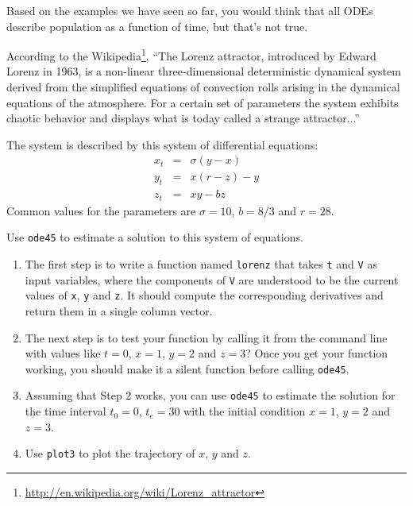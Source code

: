 \documentclass{book}
\begin{document}
\begin{ex}

Based on the examples we have seen so far, you would think that
all ODEs describe population as
a function of time, but that's not true.

According to the
Wikipedia\footnote{\url{http://en.wikipedia.org/wiki/Lorenz_attractor}},
``The Lorenz attractor, introduced by Edward Lorenz in 1963, is a
non-linear three-dimensional deterministic dynamical system derived
from the simplified equations of convection rolls arising in the
dynamical equations of the atmosphere. For a certain set of parameters
the system exhibits chaotic behavior and displays what is today called
a strange attractor...''

The system is described by this system of differential equations:
%
\begin{eqnarray}
x_t &=& \sigma (y - x) \\
y_t &=& x (r - z) - y  \\
z_t &=& xy - b z
\end{eqnarray}
%
Common values for the parameters are $\sigma = 10$, $b = 8/3$ and $r=28$.

Use {\tt ode45} to estimate a solution to this
system of equations. 


\begin{enumerate}

\item The first step is to write a function named {\tt lorenz} that
takes {\tt t} and {\tt V} as input variables, where the components
of {\tt V} are understood to be the current values of {\tt x},
{\tt y} and {\tt z}. It should compute the corresponding derivatives
and return them in a single column vector.

\item The next step is to test your function by calling it from
the command line with values like
$t=0$, $x=1$, $y=2$ and $z=3$? Once you get your function working,
you should make it a silent function before calling {\tt ode45}.

\item Assuming that Step 2 works, you can use {\tt ode45}
to estimate the solution for the time interval $t_0 = 0$, $t_e = 30$
with the initial condition $x=1$, $y=2$ and $z=3$.

\item Use {\tt plot3} to plot the trajectory of
$x$, $y$ and $z$.

\end{enumerate}

\end{ex}
\end{document}

